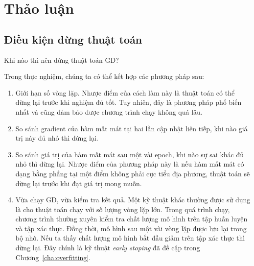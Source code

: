  

 
\section{Thảo luận}
\subsection{Điều kiện dừng thuật toán}
Khi nào thì nên dừng thuật toán GD? 
 
Trong thực nghiệm, chúng ta có thể kết hợp các phương pháp sau:
\begin{enumerate}
    \item  Giới hạn số vòng lặp. Nhược điểm của cách
    làm này là thuật toán có thể dừng lại trước khi nghiệm đủ tốt. Tuy nhiên,
    đây là phương pháp phổ biến nhất và cũng đảm bảo được chương trình chạy
    không quá lâu.

    \item  So sánh gradient của hàm mất mát tại hai lần cập nhật liên tiếp, khi nào
    giá trị này đủ nhỏ thì dừng lại.

    \item  So sánh giá trị của hàm mất mát sau một vài epoch, khi nào sự sai
    khác đủ nhỏ thì dừng lại. Nhược điểm của phương pháp này là nếu hàm mất mát có
    dạng {bằng phẳng} tại một điểm không phải cực tiểu địa phương, thuật
    toán sẽ dừng lại trước khi đạt giá trị mong muốn.

    \item Vừa chạy GD, vừa kiểm tra kết quả. Một kỹ thuật khác thường
    được sử dụng là cho thuật toán chạy với số lượng vòng lặp lớn. Trong quá
    trình chạy, chương trình thường xuyên kiểm tra chất lượng mô hình trên tập
    huấn luyện và tập xác thực. Đồng thời, mô hình sau một vài vòng lặp được lưu
    lại trong bộ nhớ. Nếu ta thấy chất lượng mô hình bắt đầu giảm trên tập xác thực thì dừng lại. Đây chính là kỹ thuật \textit{early stoping} đã đề cập trong Chương~\ref{cha:overfitting}.


\end{enumerate}
 
